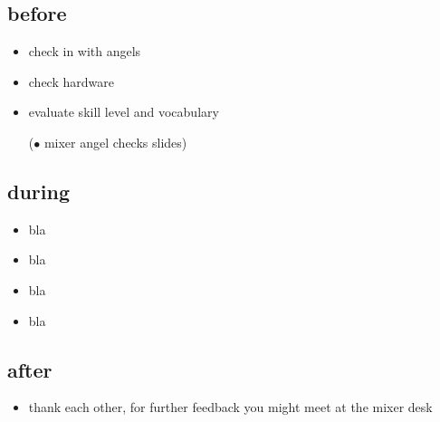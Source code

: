\documentclass[hyperref={pdfpagelabels=false}]{beamer}
\begin{document}
\subsection{before}
\begin{frame}
\begin{itemize}[<+->]
\item check in with angels %
\item check hardware %
\item evaluate skill level and vocabulary %
\item [($\bullet$ ] mixer angel checks slides) %
\end{itemize} 
\end{frame}

\begin{frame}
\subsection{during}
\begin{itemize}
\item  bla 
\item  bla 
\item  bla 
\item  bla
\end{itemize} 
\end{frame}

\begin{frame}
\subsection{after}
\begin{itemize}
\item thank each other, for further feedback you might meet at the mixer desk
\end{itemize} 
\end{frame}
\end{document}

